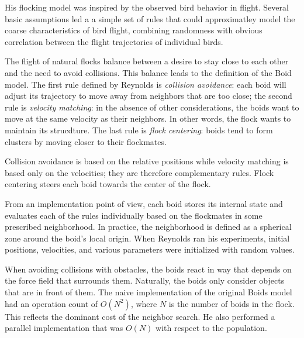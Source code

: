 His flocking model was inspired by the observed bird behavior in flight.  Several basic assumptions led a a simple set of rules that could approximatley model the coarse characteristics of bird flight, combining randomness with obvious correlation between the flight trajectories of individual birds.  

The flight of natural flocks balance between a desire to stay close to each other and the need to avoid collisions.  
This balance leads to the definition of the Boid model. The first rule defined by Reynolds is \textit{collision avoidance}: each boid will adjust its trajectory to move away from neighbors that are too close;   the second rule is \textit{velocity matching}: in the absence of other considerations, the boids want to move at the same velocity as their neighbors. In other words, the flock wants to maintain its strucdture.  The last rule is \textit{flock centering}: boids tend to form clusters by moving closer to their flockmates. 

Collision avoidance is based on the relative positions while velocity matching is based only on the velocities; they are therefore complementary rules. Flock centering steers each boid 
towards the center of the flock. 

From an implementation point of view, each boid stores its internal state and 
evaluates each of the rules individually based on the flockmates in some prescribed neighborhood. 
In practice, the neighborhood is defined as a spherical zone around the boid's local origin.
When Reynolds ran his experiments, initial positions, velocities, and various parameters were initialized with random values. 

When avoiding collisions with obstacles, the boids react in  way that depends on the force field that surrounds them. Naturally, the boids only consider objects that are in front of them. The naive implementation of the original Boids model  had an operation count of $O(N^2)$, where $N$ is the number of boids in the flock. This reflects the dominant cost of the neighbor search. He also performed a parallel implementation that was $O(N)$ with respect to the population.

